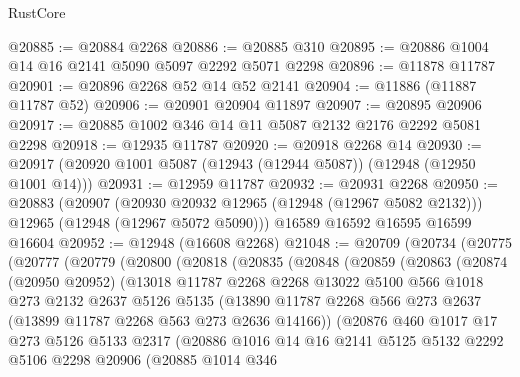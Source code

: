\begin{lexlean}{RustCore}
\begin{coremodule}
@20885 := @20884 @2268
@20886 := @20885 @310
@20895 := @20886 @1004 @14 @16 @2141 @5090 @5097 @2292 @5071 @2298
@20896 := @11878 @11787
@20901 := @20896 @2268 @52 @14 @52 @2141
@20904 := @11886 (@11887 @11787 @52)
@20906 := @20901 @20904 @11897
@20907 := @20895 @20906
@20917 := @20885 @1002 @346 @14 @11 @5087 @2132 @2176 @2292 @5081 @2298
@20918 := @12935 @11787
@20920 := @20918 @2268 @14
@20930 := @20917 (@20920 @1001 @5087 (@12943 (@12944 @5087)) (@12948 (@12950 @1001 @14)))
@20931 := @12959 @11787
@20932 := @20931 @2268
@20950 := @20883
    (@20907
      (@20930 @20932 @12965 (@12948 (@12967 @5082 @2132)))
      @12965
      (@12948 (@12967 @5072 @5090)))
    @16589
    @16592
    @16595
    @16599
    @16604
@20952 := @12948 (@16608 @2268)
@21048 := @20709
    (@20734
      (@20775
        (@20777
          (@20779
            (@20800
              (@20818
                (@20835
                  (@20848
                    (@20859
                      (@20863
                        (@20874
                          (@20950 @20952)
                          (@13018
                            @11787
                            @2268
                            @2268
                            @13022
                            @5100
                            @566
                            @1018
                            @273
                            @2132
                            @2637
                            @5126
                            @5135
                            (@13890
                              @11787
                              @2268
                              @566
                              @273
                              @2637
                              (@13899 @11787 @2268 @563 @273 @2636 @14166))
                            (@20876
                              @460
                              @1017
                              @17
                              @273
                              @5126
                              @5133
                              @2317
                              (@20886
                                @1016
                                @14
                                @16
                                @2141
                                @5125
                                @5132
                                @2292
                                @5106
                                @2298
                                @20906
                                (@20885
                                  @1014
                                  @346

\end{coremodule}
\end{lexlean}
